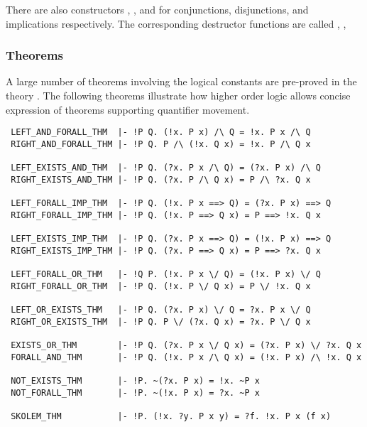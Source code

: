 \noindent There are also constructors
,
,
 and
for conjunctions, disjunctions, and implications respectively.
The corresponding destructor functions are called , \etc,

\subsubsection{Theorems}

A large number of theorems involving the logical constants are
pre-proved in the theory . The following theorems
illustrate how higher order logic allows concise expression of
theorems supporting quantifier movement.

\begin{boxed}
\begin{verbatim}
 LEFT_AND_FORALL_THM  |- !P Q. (!x. P x) /\ Q = !x. P x /\ Q
 RIGHT_AND_FORALL_THM |- !P Q. P /\ (!x. Q x) = !x. P /\ Q x

 LEFT_EXISTS_AND_THM  |- !P Q. (?x. P x /\ Q) = (?x. P x) /\ Q
 RIGHT_EXISTS_AND_THM |- !P Q. (?x. P /\ Q x) = P /\ ?x. Q x

 LEFT_FORALL_IMP_THM  |- !P Q. (!x. P x ==> Q) = (?x. P x) ==> Q
 RIGHT_FORALL_IMP_THM |- !P Q. (!x. P ==> Q x) = P ==> !x. Q x

 LEFT_EXISTS_IMP_THM  |- !P Q. (?x. P x ==> Q) = (!x. P x) ==> Q
 RIGHT_EXISTS_IMP_THM |- !P Q. (?x. P ==> Q x) = P ==> ?x. Q x

 LEFT_FORALL_OR_THM   |- !Q P. (!x. P x \/ Q) = (!x. P x) \/ Q
 RIGHT_FORALL_OR_THM  |- !P Q. (!x. P \/ Q x) = P \/ !x. Q x

 LEFT_OR_EXISTS_THM   |- !P Q. (?x. P x) \/ Q = ?x. P x \/ Q
 RIGHT_OR_EXISTS_THM  |- !P Q. P \/ (?x. Q x) = ?x. P \/ Q x

 EXISTS_OR_THM        |- !P Q. (?x. P x \/ Q x) = (?x. P x) \/ ?x. Q x
 FORALL_AND_THM       |- !P Q. (!x. P x /\ Q x) = (!x. P x) /\ !x. Q x

 NOT_EXISTS_THM       |- !P. ~(?x. P x) = !x. ~P x
 NOT_FORALL_THM       |- !P. ~(!x. P x) = ?x. ~P x

 SKOLEM_THM           |- !P. (!x. ?y. P x y) = ?f. !x. P x (f x)
\end{verbatim}
\end{boxed}

